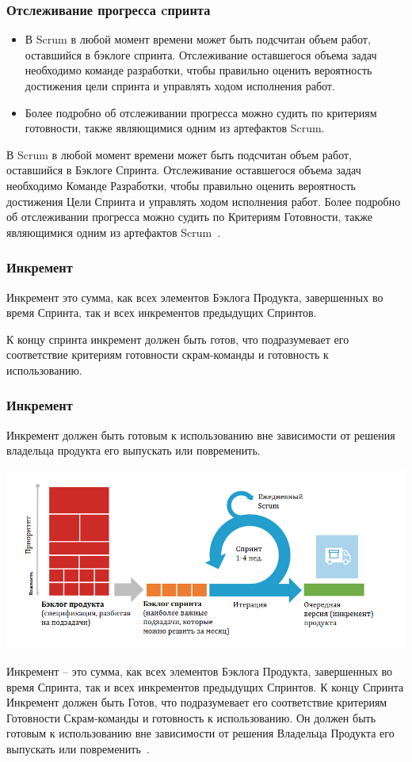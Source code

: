 \documentclass{../industrial-development}
\begin{document}
\begin{frame} \frametitle {Отслеживание прогресса cпринта}

\begin{itemize}
\item В Scrum в любой момент времени \alert{может быть подсчитан} 
объем работ, оставшийся в бэклоге  спринта. Отслеживание оставшегося объема задач необходимо команде разработки, чтобы \alert{правильно оценить} вероятность достижения цели спринта и управлять ходом исполнения работ. 

\item Более подробно об отслеживании прогресса можно судить по \alert{критериям готовности}, также являющимися одним из артефактов Scrum.
\end{itemize} 
\end{frame} 
\lecturenotes
В Scrum в любой момент времени может быть подсчитан 
объем работ, оставшийся в Бэклоге Спринта. Отслеживание оставшегося объема задач необходимо Команде Разработки, чтобы
правильно оценить вероятность достижения Цели Спринта и управлять ходом исполнения работ. Более подробно об отслеживании прогресса можно судить по Критериям Готовности, также являющимися одним из артефактов Scrum~\cite{Scrum}.

\begin{frame} \frametitle {Инкремент}
\begin {block}{Инкремент}
это сумма, как всех элементов Бэклога Продукта, завершенных во время
Спринта, так и всех инкрементов предыдущих Спринтов.
\end{block} 
К концу спринта инкремент должен быть готов, что подразумевает его соответствие
критериям готовности скрам‐команды и готовность к использованию.
\end {frame}

\begin{frame} \frametitle{Инкремент}
Инкремент должен быть готовым к использованию вне зависимости от решения владельца продукта его выпускать или повременить.
\centerline{\includegraphics[height=0.6\textheight]{scrum.png}}
\end{frame} 
\lecturenotes
Инкремент – это сумма, как всех элементов Бэклога Продукта, завершенных во время
Спринта, так и всех инкрементов предыдущих Спринтов.
К концу Спринта Инкремент должен быть Готов, что подразумевает его соответствие
критериям Готовности Скрам‐команды и готовность к использованию. Он должен быть готовым к использованию вне зависимости от решения Владельца Продукта его выпускать или повременить~\cite{Scrum}.
\end{document}
